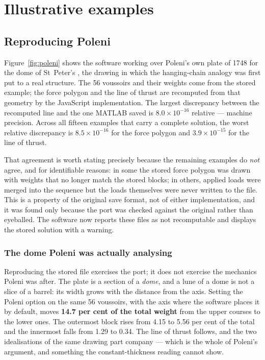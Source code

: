 \documentclass[final,3p,times,twocolumn]{elsarticle}
\begin{document}

\section{Illustrative examples}

\subsection{Reproducing Poleni}
\label{sec:legacy}

Figure~\ref{fig:poleni} shows the software working over Poleni's own plate of
1748 for the dome of St~Peter's \cite{Poleni1748}, the drawing in which the
hanging-chain analogy was first put to a real structure. The 56 voussoirs and
their weights come from the stored example; the force polygon and the line of
thrust are recomputed from that geometry by the JavaScript implementation. The
largest discrepancy between the recomputed line and the one MATLAB saved is
$8.0\times10^{-16}$ relative --- machine precision. Across all fifteen
examples that carry a complete solution, the worst relative discrepancy is
$8.5\times10^{-16}$ for the force polygon and $3.9\times10^{-15}$ for the line
of thrust.

That agreement is worth stating precisely because the remaining examples do
\emph{not} agree, and for identifiable reasons: in some the stored force
polygon was drawn with weights that no longer match the stored blocks; in
others, applied loads were merged into the sequence but the loads themselves
were never written to the file. This is a property of the original save format,
not of either implementation, and it was found only because the port was
checked against the original rather than eyeballed. The software now reports
these files as not recomputable and displays the stored solution with a
warning.

\subsubsection*{The dome Poleni was actually analysing}

Reproducing the stored file exercises the port; it does not exercise the
mechanics Poleni was after. The plate is a section of a \emph{dome}, and a
lune of a dome is not a slice of a barrel: its width grows with the distance
from the axis. Setting the Poleni option on the same 56 voussoirs, with the
axis where the software places it by default, moves \textbf{14.7 per cent of
the total weight} from the upper courses to the lower ones. The outermost block
rises from 4.15 to 5.56 per cent of the total and the innermost falls from 1.29
to 0.34. The line of thrust follows, and the two idealisations of the same
drawing part company --- which is the whole of Poleni's argument, and something
the constant-thickness reading cannot show.
\end{document}
